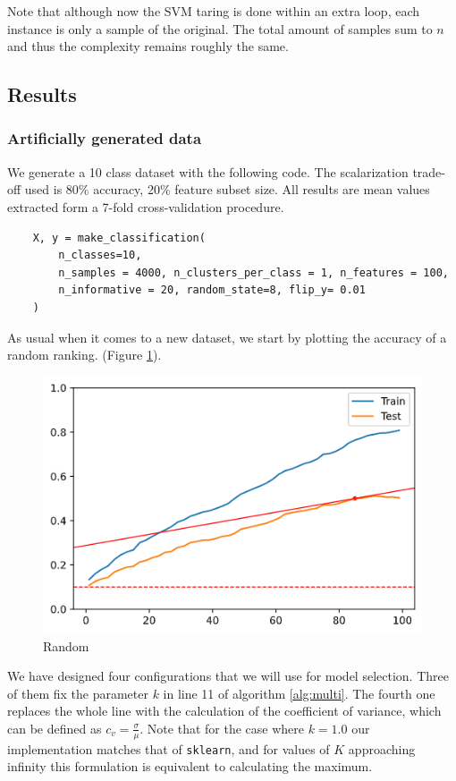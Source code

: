Note that although now the SVM taring is done within an extra loop, each in\-stance is only a sample of the original. The total amount of samples sum to $n$ and thus the complexity remains roughly the same. 

\subsection{Results}

\subsubsection*{Artificially generated data}

We generate a 10 class dataset with the following code.  The scalarization trade-off used is 80\% accuracy, 20\% feature subset size. All results are mean values extracted form a 7-fold cross-validation procedure.

\begin{verbatim}
    X, y = make_classification(
        n_classes=10,
        n_samples = 4000, n_clusters_per_class = 1, n_features = 100, 
        n_informative = 20, random_state=8, flip_y= 0.01
    )
\end{verbatim}

As usual when it comes to a new dataset, we start by plotting the accuracy of a random ranking. (Figure \ref{fig:ch5.multi.random}).

\begin{figure}[h]
    \centering
    \includegraphics[width=0.5\linewidth]{img/ch5/multi/random.png}
    \caption{Random}
    \label{fig:ch5.multi.random}
\end{figure}

We have designed four configurations that we will use for model selection. Three of them fix the parameter $k$ in line 11 of algorithm \ref{alg:multi}. The fourth one replaces the whole line with the calculation of the coefficient of variance, which can be defined as $c_v = \frac{\sigma}{\mu}$. Note that for the case where $k = 1.0$ our implementation matches that of \texttt{sklearn}, and for values of $K$ approaching infinity this formulation is equivalent to calculating the maximum.

